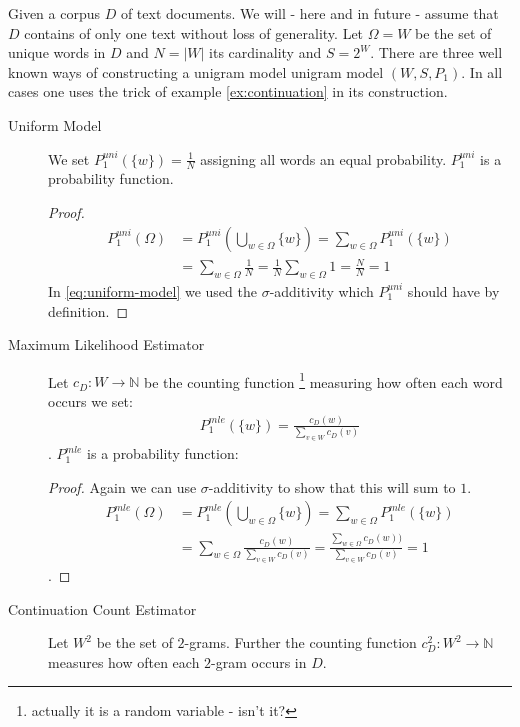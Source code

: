 \documentclass[•]{book}
\begin{document}
\begin{example}\label{ex:unigram-model}
Given a corpus $D$ of text documents. We will - here and in future - assume that $D$ contains of only one text without loss of generality.  Let $\Omega=W$ be the set of unique words in $D$ and $N = |W|$ its cardinality and $S=2^{W}$. There are three well known ways of constructing a unigram model unigram model $(W,S,P_1)$. In all cases one uses the trick of example \ref{ex:continuation} in its construction. 
\begin{description}
\item[Uniform Model] We set $P_1^{uni}(\{w\})=\frac{1}{N}$ assigning all words an equal probability.  $P_1^{uni}$ is a probability function. 
\begin{proof}
\begin{align}
P_1^{uni}(\Omega) & = P_1^{uni}(\bigcup_{w\in\Omega}\{w\}) = \sum_{w\in\Omega}P_1^{uni}(\{w\}) \label{eq:uniform-model}\\
 &  = \sum_{w\in\Omega}\frac{1}{N}  =  \frac{1}{N} \sum_{w\in\Omega}1= \frac{N}{N} = 1 
\end{align}
In \ref{eq:uniform-model} we used the $\sigma$-additivity which $P_1^{uni}$ should have by definition. 
\end{proof}
\item[Maximum Likelihood Estimator]  Let $c_D:W\longrightarrow\mathbb{N}$ be  the counting function \footnote{actually it is a random variable - isn't it?} measuring  how often each word occurs we set: 
\begin{align}
P_1^{mle}(\{w\})=\frac{c_D(w)}{\sum_{v\in W}c_D(v)}
\end{align}. 
$P_1^{mle}$ is a probability function:
\begin{proof}
Again we can use $\sigma$-additivity to show that this will sum to $1$. 
\begin{align}
P_1^{mle}(\Omega) & = P_1^{mle}(\bigcup_{w\in\Omega}\{w\}) = \sum_{w\in\Omega}P_1^{mle}(\{w\} )  \\
& =  \sum_{w\in\Omega} \frac{c_D(w)}{\sum_{v\in W}c_D(v)} = \frac{\sum_{w\in \Omega}c_D(w))}{\sum_{v\in W}c_D(v)} = 1
\end{align}
.
\end{proof}
\item[Continuation Count Estimator] Let $W^2$ be the set of $2$-grams. 
Further the counting function $c_D^2:W^2\longrightarrow \mathbb{N}$ measures how often each $2$-gram occurs in $D$. 

\end{description}
\end{example}
\end{document}
